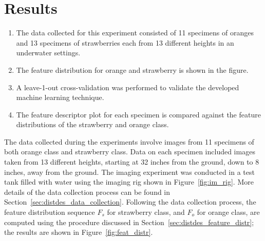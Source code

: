\documentclass {udthesis}
\begin{document}
\section{Results}
\begin{enumerate}
	\item The data collected for this experiment consisted of 11 specimens of oranges and 13 specimens of strawberries each from 13 different heights in an underwater settings.
	
	\item The feature distribution for orange and strawberry is shown in the figure.
	
	\item A leave-1-out cross-validation was performed to validate the developed machine learning technique.
	
	\item The feature descriptor plot for each specimen is compared against the feature distributions of the strawberry and orange class.
\end{enumerate}

The data collected during the experiments involve images from 11 specimens of both orange class and strawberry class. Data on each specimen included images taken from 13 different heights, starting at 32 inches from the ground, down to 8 inches, away from the ground. The imaging experiment was conducted in a test tank filled with water using the imaging rig shown in Figure~\ref{fig:im_rig}. More details of the data collection process can be found in Section~\ref{sec:distdes_data_collection}. Following the data collection process, the feature distribution sequence $F_{s}$ for strawberry class, and $F_{o}$  for orange class, are computed using the procedure discussed in Section~\ref{sec:distdes_feature_distr}; the results are shown in Figure~\ref{fig:feat_distr}.
\end{document}
